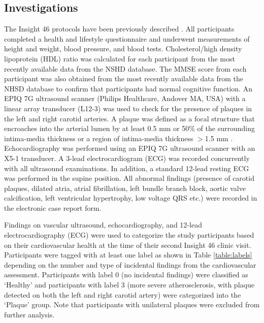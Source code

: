 \documentclass[12pt]{spieman}  %
\begin{document}
\begin{spacing}{2}
\subsection{Investigations}
The Insight 46 protocols have  been previously described \cite{Mason2020b}. All participants completed a health and lifestyle questionnaire and underwent measurements of height and weight, blood pressure, and blood tests. Cholesterol/high density lipoprotein (HDL) ratio was calculated for each participant from the most recently available data from the NSHD database. The MMSE score from each participant was also obtained from the most recently available data from the NHSD database to confirm that participants had normal cognitive function. An EPIQ 7G ultrasound scanner (Philips Healthcare, Andover MA, USA) with a linear array transducer (L12-3) was used to check for the presence of plaques in the left and right carotid arteries. A plaque was defined as a focal structure that encroaches into the arterial lumen by at least 0.5 mm or 50\% of the surrounding intima-media thickness or a region of intima-media thickness $>$1.5 mm \cite{Touboul2012}. Echocardiography was performed using an EPIQ 7G ultrasound scanner with an X5-1 transducer. A 3-lead  electrocardiogram (ECG) was recorded concurrently with all ultrasound examinations. In addition, a standard 12-lead resting ECG was performed in the supine position. All abnormal findings (presence of carotid plaques, dilated atria, atrial fibrillation, left bundle branch block, aortic valve calcification, left ventricular hypertrophy, low voltage QRS  etc.) were recorded in the electronic case report form. 

Findings on vascular ultrasound, echocardiography, and 12-lead electrocardiography (ECG) were used to categorize the study participants based on their cardiovascular health at the time of their second Insight 46 clinic visit. Participants were tagged with at least one label as shown in Table \ref{table:labels} depending on the number and type of incidental findings from the cardiovascular assessment. Participants with label 0 (no incidental findings) were classified as  `Healthy' and participants with label 3 (more severe atherosclerosis, with plaque detected on both the left and right carotid artery) were categorized into the `Plaque' group. Note that participants with unilateral plaques were excluded from further analysis. 




\end{spacing}
\end{document}
